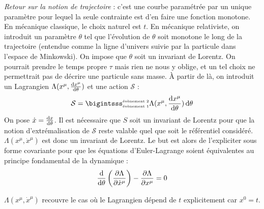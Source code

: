 {\txt \emph{Retour sur la notion de trajectoire }: c'est une courbe paramétrée par un unique paramètre pour lequel la seule contrainte est d'en faire une fonction monotone. En mécanique classique, le choix naturel est $t$. En mécanique relativiste, on introduit un paramètre $\theta$ tel que l'évolution de $\theta$ soit monotone le long de la trajectoire (entendue comme la ligne d'univers suivie par la particule dans l'espace de Minkowski). On impose que $\theta$ soit un invariant de Lorentz. On pourrait prendre le temps propre $\tau$ mais rien ne nous y oblige, et un tel choix ne permettrait pas de décrire une particule sans masse. À partir de là, on introduit un Lagrangien $\Lambda(x^\mu,\frac{\mathrm{d} x^\mu}{\mathrm{d}\theta})$ et une action $\mathcal{S}$ :}
$$
	\mathcal{S}=\bigintsss_{\text{\tiny évènement 1}}^{\text{\tiny évènement 2}} \Lambda(x^\mu,\frac{\dif x^\mu}{\dif\theta})\,\dif\theta
$$
{\txt On pose $\dot{x}=\frac{\mathrm{d} x}{\mathrm{d}\theta}$. Il est nécessaire que $S$ soit un invariant de Lorentz pour que la notion d'extrémalisation de $\mathcal{S}$ reste valable quel que soit le référentiel considéré. $\Lambda(x^\mu,\dot{x}^\mu)$ est donc un invariant de Lorentz. Le but est alors de l'expliciter sous forme covariante pour que les équations d'Euler-Lagrange soient équivalentes au principe fondamental de la dynamique :}
$$
	\frac{\mathrm{d}}{\mathrm{d}\theta}\left(\frac{\partial \Lambda}{\partial\dot{x}^\mu}\right)-\frac{\partial\Lambda}{\partial x^\mu}=0
$$ 
\begin{remark}
	$\Lambda(x^\mu,\dot{x}^\mu)$ recouvre le cas où le Lagrangien dépend de $t$ explicitement car $x^0=t$.
\end{remark}

